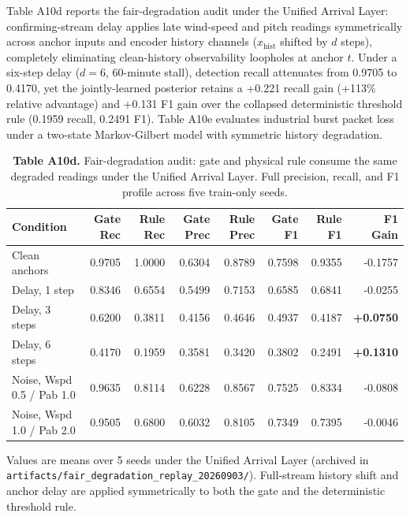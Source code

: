 \documentclass[
  journal]{IEEEtran}
\begin{document}
Table A10d reports the fair-degradation audit under the Unified Arrival
Layer: confirming-stream delay applies late wind-speed and pitch
readings symmetrically across anchor inputs and encoder history channels
(\(x_{\mathrm{hist}}\) shifted by \(d\) steps), completely eliminating
clean-history observability loopholes at anchor \(t\). Under a six-step
delay (\(d=6\), 60-minute stall), detection recall attenuates from
0.9705 to 0.4170, yet the jointly-learned posterior retains a +0.221
recall gain (+113\% relative advantage) and +0.131 F1 gain over the
collapsed deterministic threshold rule (0.1959 recall, 0.2491 F1). Table
A10e evaluates industrial burst packet loss under a two-state
Markov-Gilbert model with symmetric history degradation.

\begin{table}[!t]
\centering
\fontsize{8.0pt}{9.6pt}\selectfont
\setlength{\tabcolsep}{2pt}
\renewcommand{\arraystretch}{1.05}
\caption*{\textbf{Table A10d.} Fair-degradation audit: gate and physical rule consume the same degraded readings under the Unified Arrival Layer. Full precision, recall, and F1 profile across five train-only seeds.}
%
\begin{tabular}{lrrrrrrr}
\toprule
Condition & Gate Rec & Rule Rec & Gate Prec & Rule Prec & Gate F1 & Rule F1 & F1 Gain \\
\midrule
Clean anchors & 0.9705 & 1.0000 & 0.6304 & 0.8789 & 0.7598 & 0.9355 & -0.1757 \\
Delay, 1 step & 0.8346 & 0.6554 & 0.5499 & 0.7153 & 0.6585 & 0.6841 & -0.0255 \\
Delay, 3 steps & 0.6200 & 0.3811 & 0.4156 & 0.4646 & 0.4937 & 0.4187 & \textbf{+0.0750} \\
Delay, 6 steps & 0.4170 & 0.1959 & 0.3581 & 0.3420 & 0.3802 & 0.2491 & \textbf{+0.1310} \\
Noise, Wspd 0.5 / Pab 1.0 & 0.9635 & 0.8114 & 0.6228 & 0.8567 & 0.7525 & 0.8334 & -0.0808 \\
Noise, Wspd 1.0 / Pab 2.0 & 0.9505 & 0.6800 & 0.6032 & 0.8105 & 0.7349 & 0.7395 & -0.0046 \\
\bottomrule
\end{tabular}
\vspace{1mm}
\fontsize{8.0pt}{9.6pt}\selectfont Values are means over 5 seeds under the Unified Arrival Layer (archived in \texttt{artifacts/fair\_degradation\_replay\_20260903/}). Full-stream history shift and anchor delay are applied symmetrically to both the gate and the deterministic threshold rule.
\end{table}
\end{document}
